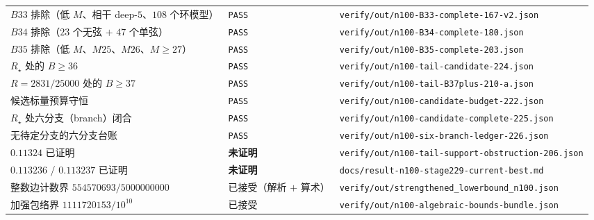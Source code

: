 {\begin{longtable}{@{}@{}>{\raggedright\arraybackslash}p{}>{\raggedright\arraybackslash}p{}>{\raggedright\arraybackslash}p{}@{}}
$B33$ 排除（低 $M$、相干 deep-$5$、$108$ 个环模型） & \texttt{PASS} &
\texttt{verify/\allowbreak{}out/\allowbreak{}n100-\allowbreak{}B33-\allowbreak{}complete-\allowbreak{}167-\allowbreak{}v2.json} \\
$B34$ 排除（$23$ 个无弦 $+$ $47$ 个单弦） & \texttt{PASS} &
\texttt{verify/\allowbreak{}out/\allowbreak{}n100-\allowbreak{}B34-\allowbreak{}complete-\allowbreak{}180.json} \\
$B35$ 排除（低 $M$、$M25$、$M26$、$M\ge27$） & \texttt{PASS} &
\texttt{verify/\allowbreak{}out/\allowbreak{}n100-\allowbreak{}B35-\allowbreak{}complete-\allowbreak{}203.json} \\
$R_\star$ 处的 $B\ge36$ & \texttt{PASS} & \texttt{verify/\allowbreak{}out/\allowbreak{}n100-\allowbreak{}tail-\allowbreak{}candidate-\allowbreak{}224.json} \\
$R=2831/25000$ 处的 $B\ge37$ & \texttt{PASS} &
\texttt{verify/\allowbreak{}out/\allowbreak{}n100-\allowbreak{}tail-\allowbreak{}B37plus-\allowbreak{}210-\allowbreak{}a.json} \\
候选标量预算守恒 & \texttt{PASS} &
\texttt{verify/\allowbreak{}out/\allowbreak{}n100-\allowbreak{}candidate-\allowbreak{}budget-\allowbreak{}222.json} \\
$R_\star$ 处六分支（branch）闭合 & \texttt{PASS} &
\texttt{verify/\allowbreak{}out/\allowbreak{}n100-\allowbreak{}candidate-\allowbreak{}complete-\allowbreak{}225.json} \\
无待定分支的六分支台账 & \texttt{PASS} &
\texttt{verify/\allowbreak{}out/\allowbreak{}n100-\allowbreak{}six-\allowbreak{}branch-\allowbreak{}ledger-\allowbreak{}226.json} \\
$0.11324$ 已证明 & \textbf{未证明} &
{\footnotesize\texttt{verify/\allowbreak{}out/\allowbreak{}n100-\allowbreak{}tail-\allowbreak{}support-\allowbreak{}obstruction-\allowbreak{}206.json}} \\
$0.113236$ / $0.113237$ 已证明 & \textbf{未证明} &
{\footnotesize\texttt{docs/\allowbreak{}result-\allowbreak{}n100-\allowbreak{}stage229-\allowbreak{}current-\allowbreak{}best.md}} \\
整数边计数界 $554570693/5000000000$ & 已接受（解析 $+$ 算术） &
{\footnotesize\texttt{verify/\allowbreak{}out/\allowbreak{}strengthened\_\allowbreak{}lowerbound\_\allowbreak{}n100.json}} \\
加强包络界 $1111720153/10^{10}$ & 已接受 &
\texttt{verify/\allowbreak{}out/\allowbreak{}n100-\allowbreak{}algebraic-\allowbreak{}bounds-\allowbreak{}bundle.json} \\

\end{longtable}}

